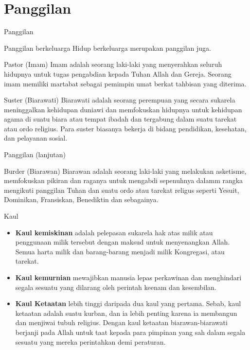 \documentclass[aspectratio=169]{beamer}
\begin{document}
\section{Panggilan}
\begin{frame}{Panggilan}
    \begin{block}{Panggilan berkeluarga}
        Hidup berkeluarga merupakan panggilan juga.
    \end{block}
    \pause  
    \begin{exampleblock}{Pastor (Imam)}
    Imam adalah seorang laki-laki yang menyerahkan seluruh hidupnya untuk tugas pengabdian kepada Tuhan Allah dan Gereja. Seorang imam memiliki martabat sebagai pemimpin umat berkat tahbisan yang diterima.
    \end{exampleblock}

    \begin{exampleblock}{Suster (Biarawati)}
    Biarawati adalah seorang perempuan yang secara sukarela meninggalkan kehidupan duniawi dan memfokuskan hidupnya untuk kehidupan agama di suatu biara atau tempat ibadah dan tergabung dalam suatu tarekat atau ordo religius.  Para suster biasanya bekerja di bidang pendidikan, kesehatan, dan pelayanan sosial. 

    \end{exampleblock}
\end{frame} 

\begin{frame}{Panggilan (lanjutan)}
    \begin{exampleblock}{Burder (Biarawan)}
    Biarawan adalah seorang laki-laki yang melakukan asketisme, memfokuskan pikiran dan raganya untuk mengabdi sepenuhnya dalamm rangka mengikuti panggilan Tuhan dan suatu ordo atau tarekat religus seperti Yesuit, Dominikan, Fransiskan, Benediktin dan sebagainya. 
    \end{exampleblock}

    \begin{block}{Kaul}
\begin{itemize}[<+->]
	\item \textbf{Kaul kemiskinan}
adalah pelepasan sukarela hak atas milik atau penggunaan milik tersebut dengan maksud untuk menyenangkan Allah. Semua harta milik dan barang-barang menjadi milik Kongregasi, atau tarekat. 
    \item \textbf{Kaul kemurnian} mewajibkan manusia lepas perkawinan dan menghindari segala sesuatu yang dilarang oleh perintah keenam dan kesembilan. 
    \item \textbf{Kaul Ketaatan} lebih tinggi daripada dua kaul yang pertama. Sebab, kaul ketaatan adalah suatu kurban, dan ia lebih penting karena ia membangun dan menjiwai tubuh religius. Dengan kaul ketaatan biarawan-biarawati berjanji pada Allah untuk taat kepada para pimpinan yang sah dalam segala sesuatu yang mereka perintahkan demi peraturan. 
\end{itemize}
    
    \end{block}
\end{frame} 
\end{document}
